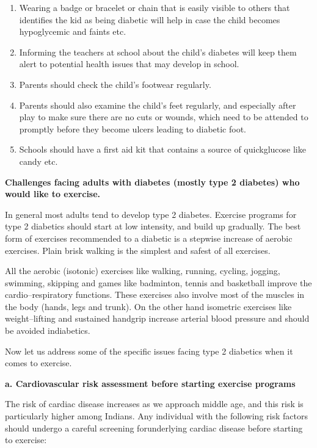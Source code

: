\begin{enumerate}[•]
\itemsep=0pt
\item Wearing a badge or bracelet or chain that is easily visible to others that identifies the kid as being diabetic will help in case the child becomes hypoglycemic and faints etc.
\item Informing the teachers at school about the child’s diabetes will keep them alert to potential health issues that may develop in school.
\item Parents should check the child’s footwear regularly.
\item Parents should also examine the child’s feet regularly, and especially after play to make sure there are no cuts or wounds, which need to be attended to promptly before they become ulcers leading to diabetic foot.
\item Schools should have a first aid kit that contains a source of quick\break glucose like candy etc.
\end{enumerate}

\noindent\textbf{Challenges facing adults with diabetes (mostly type 2 diabetes) who would like to exercise.}

In general most adults tend to develop type 2 diabetes. Exercise programs for type 2 diabetics should start at low intensity, and build up gradually. The best form of exercises recommended to a diabetic is a stepwise increase of aerobic exercises. Plain brisk walking is the simplest and safest of all exercises.

All the aerobic (isotonic) exercises like walking, running, cycling, jogging, swimming, skipping and games like badminton, tennis and basketball improve the cardio–respiratory functions. These exercises also involve most of the muscles in the body (hands, legs and trunk). On the other hand isometric exercises like weight–lifting and sustained handgrip increase arterial blood pressure and should be avoided in\break diabetics.

Now let us address some of the specific issues facing type 2 dia\-betics when it comes to exercise.

\noindent\textbf{a. Cardiovascular risk assessment before starting exercise programs}

The risk of cardiac disease increases as we approach middle age, and this risk is particularly higher among Indians. Any individual with the following risk factors should undergo a careful screening for\break underlying cardiac disease before starting to exercise:

